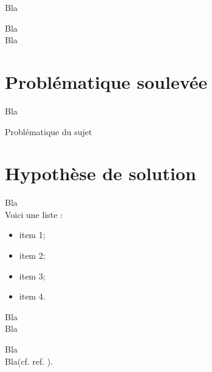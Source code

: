 {}

Bla

Bla\\

Bla

\newpage

\section{Problématique soulevée}

Bla

\begin{center}
Problématique du sujet
\end{center}

\section{Hypothèse de solution}

Bla\\

Voici une liste :
\begin{itemize}
\item item 1;
\item item 2;
\item item 3;
\item item 4.
\end{itemize}

Bla\\

Bla

Bla\footnotemark\\

Bla(cf. ref. \cite{cite6}).
\fi
